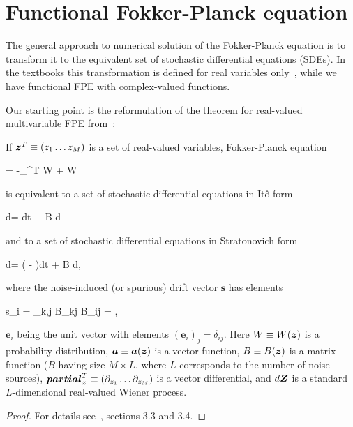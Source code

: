 \section{Functional Fokker-Planck equation}

The general approach to numerical solution of the Fokker-Planck equation is to transform it to the equivalent set of stochastic differential equations (SDEs).
In the textbooks this transformation is defined for real variables only~\cite{Risken1996}, while we have functional FPE with complex-valued functions.

Our starting point is the reformulation of the theorem for real-valued multivariable FPE from~\cite{Risken1996}:

\begin{lemma}
\label{lmm:app-fpe:fpe-sde-real}
    If $\boldsymbol{z}^T \equiv (z_1 \ldots z_M)$ is a set of real-valued variables,
    Fokker-Planck equation
    \begin{eqn*}
    	= -\boldsymbol{\partial}_{\zvec}^T  W
    	+   W
    \end{eqn*}
    is equivalent to a set of stochastic differential equations in It\^{o} form
    \begin{eqn*}
    	d\zvec =  dt + B d\Zvec
    \end{eqn*}
    and to a set of stochastic differential equations in Stratonovich form
    \begin{eqn*}
    	d\zvec = ( - )dt + B d\Zvec,
    \end{eqn*}
    where the noise-induced (or spurious) drift vector $\boldsymbol{s}$ has elements
    \begin{eqn*}
    	s_i
    	= \sum_{k,j} B_{kj}  B_{ij}
    	= ,
    \end{eqn*}
    $\boldsymbol{e}_i$ being the unit vector with elements $(\boldsymbol{e}_i)_j = \delta_{ij}$.
    Here $W \equiv W(\boldsymbol{z})$ is a probability distribution,
    $\boldsymbol{a} \equiv \boldsymbol{a}(\boldsymbol{z})$ is a vector function,
    $B \equiv B(\boldsymbol{z})$ is a matrix function ($B$ having size $M \times L$, where $L$ corresponds to the number of noise sources),
    $\boldsymbol{partial}_{\boldsymbol{z}}^T \equiv (\partial_{z_1} \ldots \partial_{z_M})$ is a vector differential,
    and $d\boldsymbol{Z}$ is a standard $L$-dimensional real-valued Wiener process.
\end{lemma}
\begin{proof}
For details see~\cite{Risken1996}, sections 3.3 and 3.4.
\end{proof}


